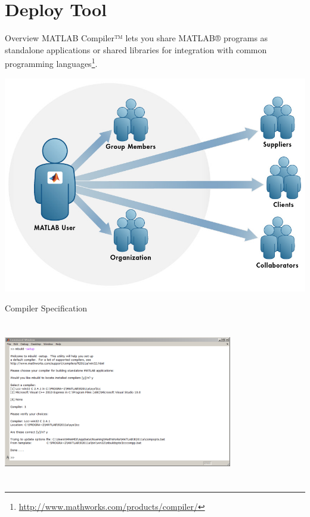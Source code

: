 \documentclass[10pt, english, notes]{beamer}
\begin{document}
\section{Deploy Tool}
\begin{frame}{Overview}
MATLAB Compiler™ lets you share MATLAB® programs as standalone applications or shared libraries for integration with common programming languages\footnote{\url{http://www.mathworks.com/products/compiler/}}.
\begin{center}
\includegraphics[scale = 0.25, angle = 0]{GUI/MatLabSharing}
\end{center}
\end{frame}
\begin{frame}{Compiler Specification}
\begin{center}
\includegraphics[height = 7cm, width = 10cm]{GUI/LCCCompiler}
\end{center}
\end{frame}
\end{document}
